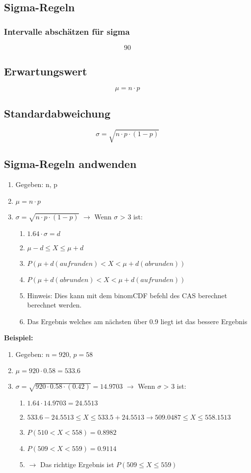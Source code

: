 \documentclass[a4paper,12pt]{article}
\begin{document}
	\subsection*{Sigma-Regeln}
	\subsubsection*{Intervalle abschätzen für sigma}
	$$
	90%
	$$
	
	\subsection*{Erwartungswert}
	$$ \mu = n \cdot p $$
	\subsection*{Standardabweichung}
	$$ \sigma = \sqrt{n \cdot p \cdot (1-p)} $$
	\subsection*{Sigma-Regeln andwenden}
		\begin{enumerate}
			\item Gegeben: n, p
			\item $ \mu = n \cdot p$
			\item $\sigma = \sqrt{n \cdot p \cdot (1-p)}$ $\rightarrow$ Wenn $\sigma$ > 3 ist:
			\begin{enumerate}
				\item $1.64 \cdot \sigma = d$
				\item $\mu -d \leq X \leq \mu + d$
				\item $P(\mu + d (aufrunden) < X <\mu + d (abrunden))$
				\item $P(\mu + d (abrunden) < X <\mu + d (aufrunden))$
				\item Hinweis: Dies kann mit dem binomCDF befehl des CAS berechnet berechnet werden.
				\item Das Ergebnis welches am nächsten über 0.9 liegt ist das bessere Ergebnis
			\end{enumerate}
		\end{enumerate}
	\textbf{Beispiel:}
	\begin{enumerate}
			\item Gegeben: $n = 920$,  $p = 58$
			\item $ \mu = 920 \cdot 0.58 = 533.6$
			\item $\sigma = \sqrt{920 \cdot 0.58 \cdot (0.42)} = 14.9703$ $\rightarrow$ Wenn $\sigma$ > 3 ist:
			\begin{enumerate}
				\item $1.64 \cdot 14.9703 = 24.5513$
				\item $533.6 - 24.5513 \leq X \leq 533.5 + 24.5513 \rightarrow 509.0487 \leq X \leq 558.1513$
				\item $P(510 < X < 558) = 0.8982$
				\item $P(509 < X <559) = 0.9114$
				\item $\rightarrow$ Das richtige Ergebnis ist $P(509 \leq X \leq 559)$
			\end{enumerate}
		\end{enumerate}
\end{document}
